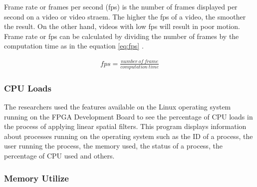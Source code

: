 Frame rate or frames per second (fps) is the number of frames displayed per second on a video or video straem. The higher the fps of a video, the smoother the result. On the other hand, videos with low fps will result in poor motion. Frame rate or fps can be calculated by dividing the number of frames by the computation time as in the equation \ref{eq:fps} \cite{pdf:pavan}.

\begin{equation}
    \label{eq:fps}
    \begin{split}
fps = \frac{number\ of\ frame}{computation\ time}
    \end{split}
\end{equation}

\subsubsection{CPU Loads}

The researchers used the features available on the Linux operating system running on the FPGA Development Board to see the percentage of CPU loads in the process of applying linear spatial filters. This program displays information about processes running on the operating system such as the ID of a process, the user running the process, the memory used, the status of a process, the percentage of CPU used and others.

\subsubsection{Memory Utilize}


